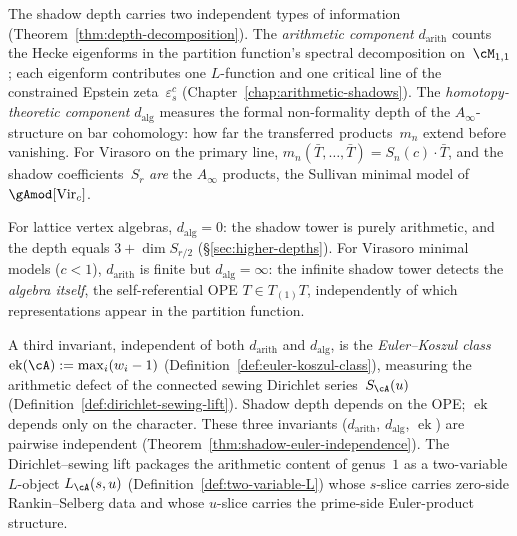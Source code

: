 \begin{remark}
\label{rem:depth-arith-vs-homotopy}
The shadow depth carries two independent types of information
(Theorem~\ref{thm:depth-decomposition}).
The \emph{arithmetic component} $d_{\mathrm{arith}}$ counts the
Hecke eigenforms in the partition function's spectral decomposition
on~$\cM_{1,1}$; each eigenform contributes one $L$-function and one
critical line of the constrained Epstein zeta~$\varepsilon^c_s$
(Chapter~\ref{chap:arithmetic-shadows}).
The \emph{homotopy-theoretic component} $d_{\mathrm{alg}}$ measures
the formal non-formality depth of the $A_\infty$-structure on bar
cohomology: how far the transferred products~$m_n$ extend before
vanishing.  For Virasoro on the primary line, $m_n(\bar{T},\dotsc,
\bar{T}) = S_n(c)\cdot\bar{T}$, and the shadow
coefficients~$S_r$ \emph{are} the $A_\infty$ products, the
Sullivan minimal model of~$\gAmod[\mathrm{Vir}_c]$.

For lattice vertex algebras, $d_{\mathrm{alg}} = 0$: the shadow
tower is purely arithmetic, and the depth equals
$3 + \dim S_{r/2}$
(\S\ref{sec:higher-depths}).
For Virasoro minimal models ($c < 1$), $d_{\mathrm{arith}}$ is
finite but $d_{\mathrm{alg}} = \infty$: the infinite shadow tower
detects the \emph{algebra itself}, the self-referential OPE
$T \in T_{(1)}T$, independently of which representations appear in
the partition function.

A third invariant, independent of both $d_{\mathrm{arith}}$ and
$d_{\mathrm{alg}}$, is the \emph{Euler--Koszul class}
$\operatorname{ek}(\cA) := \max_i(w_i - 1)$
(Definition~\ref{def:euler-koszul-class}),
measuring the arithmetic defect of the connected sewing
Dirichlet series~$S_\cA(u)$
(Definition~\ref{def:dirichlet-sewing-lift}).
Shadow depth depends on the OPE; $\operatorname{ek}$ depends
only on the character.
These three invariants ($d_{\mathrm{arith}}$,
$d_{\mathrm{alg}}$, $\operatorname{ek}$) are pairwise
independent
(Theorem~\ref{thm:shadow-euler-independence}).
The Dirichlet--sewing lift packages the arithmetic content of
genus~$1$ as a two-variable $L$-object
$L_\cA(s,u)$
(Definition~\ref{def:two-variable-L})
whose $s$-slice carries zero-side Rankin--Selberg data and
whose $u$-slice carries the prime-side Euler-product
structure.
\end{remark}

